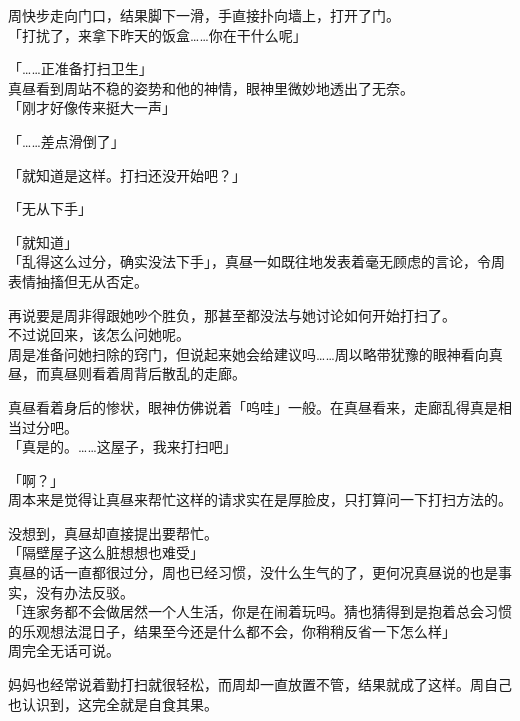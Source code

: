 周快步走向门口，结果脚下一滑，手直接扑向墙上，打开了门。\\

「打扰了，来拿下昨天的饭盒……你在干什么呢」

「……正准备打扫卫生」\\

真昼看到周站不稳的姿势和他的神情，眼神里微妙地透出了无奈。\\

「刚才好像传来挺大一声」

「……差点滑倒了」

「就知道是这样。打扫还没开始吧？」

「无从下手」

「就知道」\\

「乱得这么过分，确实没法下手」，真昼一如既往地发表着毫无顾虑的言论，令周表情抽搐但无从否定。

再说要是周非得跟她吵个胜负，那甚至都没法与她讨论如何开始打扫了。\\

不过说回来，该怎么问她呢。\\

周是准备问她扫除的窍门，但说起来她会给建议吗……周以略带犹豫的眼神看向真昼，而真昼则看着周背后散乱的走廊。

真昼看着身后的惨状，眼神仿佛说着「呜哇」一般。在真昼看来，走廊乱得真是相当过分吧。\\

「真是的。……这屋子，我来打扫吧」

「啊？」\\

周本来是觉得让真昼来帮忙这样的请求实在是厚脸皮，只打算问一下打扫方法的。

没想到，真昼却直接提出要帮忙。\\

「隔壁屋子这么脏想想也难受」\\

真昼的话一直都很过分，周也已经习惯，没什么生气的了，更何况真昼说的也是事实，没有办法反驳。\\

「连家务都不会做居然一个人生活，你是在闹着玩吗。猜也猜得到是抱着总会习惯的乐观想法混日子，结果至今还是什么都不会，你稍稍反省一下怎么样」\\

周完全无话可说。

妈妈也经常说着勤打扫就很轻松，而周却一直放置不管，结果就成了这样。周自己也认识到，这完全就是自食其果。\\

